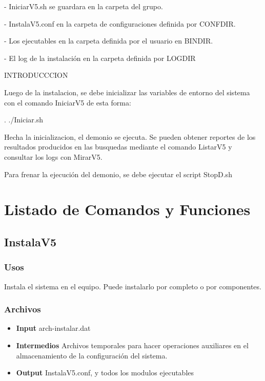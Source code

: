 \documentclass[a4paper,10pt,titlepage]{article}
\begin{document}
- IniciarV5.sh se guardara en la carpeta del grupo.

- InstalaV5.conf en la carpeta de configuraciones definida por CONFDIR.

- Los ejecutables en la carpeta definida por el usuario en BINDIR.

- El log de la instalación en la carpeta definida por LOGDIR

INTRODUCCCION

Luego de la instalacion, se debe inicializar las variables de entorno del sistema con el comando IniciarV5 de esta forma:

. ./Iniciar.sh

Hecha la inicializacion, el demonio se ejecuta. Se pueden obtener reportes de los resultados producidos en las busquedas mediante el comando ListarV5 y consultar los logs con MirarV5.

Para frenar la ejecución del demonio, se debe ejecutar el script StopD.sh

\newpage

\section{Listado de Comandos y Funciones}

	\subsection{InstalaV5}
		\subsubsection{Usos}
			
Instala el sistema en el equipo. Puede instalarlo por completo o por componentes.

		\subsubsection{Archivos}
			\begin {itemize}
				\item \textbf{Input} {arch-instalar.dat}
				\item \textbf{Intermedios} {Archivos temporales para hacer operaciones auxiliares en el almacenamiento de la configuración del sistema.}
				\item \textbf{Output} {InstalaV5.conf, y todos los modulos ejecutables}
			\end{itemize}
\end{document}
